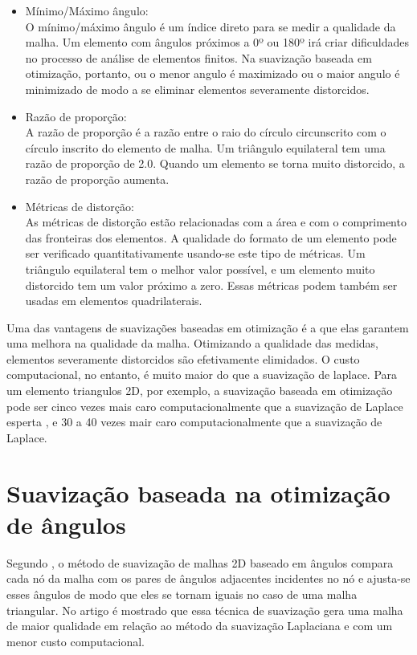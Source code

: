 \begin{itemize}
    \item Mínimo/Máximo ângulo:\\
    O mínimo/máximo ângulo é um índice direto para se medir a qualidade da malha. Um elemento com ângulos próximos a 0º ou 180º irá criar dificuldades no processo de análise de elementos finitos. Na suavização baseada em otimização, portanto, ou o menor angulo é maximizado ou o maior angulo é minimizado de modo a se eliminar elementos severamente distorcidos.
    \item Razão de proporção:\\
    A razão de proporção é a razão entre o raio do círculo circunscrito com o círculo inscrito do elemento de malha. Um triângulo equilateral tem uma razão de proporção de 2.0. Quando um elemento se torna muito distorcido, a razão de proporção aumenta.
    \item Métricas de distorção:\\
    As métricas de distorção estão relacionadas com a área e com o comprimento das fronteiras dos elementos. A qualidade do formato de um elemento pode ser verificado quantitativamente usando-se este tipo de métricas. Um triângulo equilateral tem o melhor valor possível, e um elemento muito distorcido tem um valor próximo a zero. Essas métricas podem também ser usadas em elementos quadrilaterais.
\end{itemize}

Uma das vantagens de suavizações baseadas em otimização é a que elas garantem uma melhora na qualidade da malha. Otimizando a qualidade das medidas, elementos severamente distorcidos são efetivamente elimidados. O custo computacional, no entanto, é muito maior do que a suavização de laplace. Para um elemento triangulos 2D, por exemplo, a suavização baseada em otimização pode ser cinco vezes mais caro computacionalmente que a suavização de Laplace esperta \cite{Freitag1997OnCL}, e 30 a 40 vezes mair caro computacionalmente que a suavização de Laplace.

\section{Suavização baseada na otimização de ângulos}

Segundo \cite{Zhou}, o método de suavização de malhas 2D baseado em ângulos compara cada nó da malha com os pares de ângulos adjacentes incidentes no nó e ajusta-se esses ângulos de modo que eles se tornam iguais no caso de uma malha triangular. No artigo é mostrado que essa técnica de suavização gera uma malha de maior qualidade em relação ao método da suavização Laplaciana e com um menor custo computacional.

